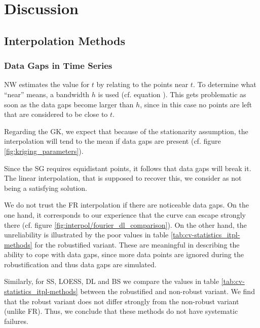 \chapter{Discussion}


\section{Interpolation Methods}{ \label{sec:discussion_itpl}
    \subsection{Data Gaps in Time Series}\label{sec:discussion_itpl_data_gaps}{
        NW estimates the value for $t$ by relating to the points near $t$. To determine what ``near'' means, a bandwidth $h$ is used (cf. equation ). This gets problematic as soon as the data gaps become larger than $h$, since in this case no points are left that are considered to be close to $t$. 

        Regarding the GK, we expect that because of the stationarity assumption, the interpolation will tend to the mean if data gaps are present (cf. figure \ref{fig:kriging_parameters}). 

        Since the SG requires equidistant points, it follows that data gaps will break it. The linear interpolation, that is supposed to recover this, we consider as not being a satisfying solution.

        We do not trust the FR interpolation if there are noticeable data gaps. On the one hand, it corresponds to our experience that the curve can escape strongly there (cf. figure \ref{fig:interpol/fourier_dl_comparison}). On the other hand, the unreliability is illustrated by the poor values in table \ref{tab:cv-statistics_itpl-methods} for the robustified variant. These are meaningful in describing the ability to cope with data gaps, since more data points are ignored during the robustification and thus data gaps are simulated. 

        Similarly, for SS, LOESS, DL and BS we compare the values in table \ref{tab:cv-statistics_itpl-methods} between the robustified and non-robust variant. We find that the robust variant does not differ strongly from the non-robust variant (unlike FR). Thus, we conclude that these methods do not have systematic failures.

}}
